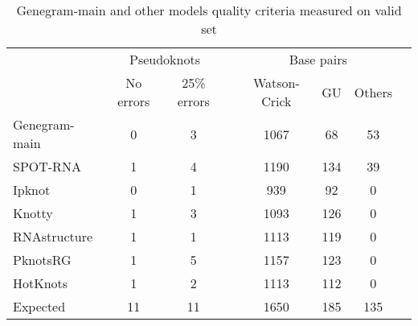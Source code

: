 \begin{table}[h!]
\centering
\caption{Genegram-main and other models quality criteria measured on valid set}
\begin{tabular}{@{}lccccccc@{}}\toprule
& \multicolumn{2}{c}{Pseudoknots} & \phantom{abc}& \multicolumn{3}{c}{Base pairs} \\
& No errors & 25\% errors  && Watson-Crick & GU & Others \\ \cmidrule{2-3} \cmidrule{5-7} 
Genegram-main  & 0 & 3 && 1067 & 68 & 53 \\
SPOT-RNA & 1 & 4 && 1190 & 134 & 39 \\
Ipknot & 0 & 1 && 939 & 92 & 0 \\
Knotty &1 & 3 && 1093 & 126 & 0 \\
RNAstructure & 1 & 1 && 1113 & 119 & 0 \\
PknotsRG & 1 & 5 && 1157 & 123 & 0 \\
HotKnots & 1 & 2 && 1113 & 112 & 0 \\
\bottomrule
Expected & 11 & 11 && 1650 & 185 & 135 \\
\bottomrule
\end{tabular}
\label{table_main}
\end{table}